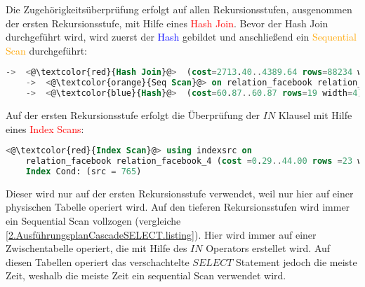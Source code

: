 Die Zugehörigkeitsüberprüfung erfolgt auf allen Rekursionsstufen, ausgenommen der ersten Rekursionsstufe, mit Hilfe eines \textcolor{red}{Hash Join}.
Bevor der Hash Join durchgeführt wird, wird zuerst der \textcolor{blue}{Hash} gebildet und anschließend ein \textcolor{orange}{Sequential Scan} durchgeführt:
\begin{lstlisting}[language=SQL,caption = Aufruf der DISTINCT Funktion,frame=single, label={2.WhereConditionCTE.listing} ]
    ->  <@\textcolor{red}{Hash Join}@>  (cost=2713.40..4389.64 rows=88234 width=4) (actual time=11.821..17.797 rows=1709 loops=1)
    ->  <@\textcolor{orange}{Seq Scan}@> on relation_facebook relation_facebook_1  (cost=10000000000.00..10000001649.62 rows=100762 width=8) (actual time=0.004..4.822 rows=100762 loops=1)
    ->  <@\textcolor{blue}{Hash}@>  (cost=60.87..60.87 rows=19 width=4) (actual time=0.022..0.022 rows=4 loops=1)
\end{lstlisting}
Auf der ersten Rekursionsstufe erfolgt die Überprüfung der $IN$ Klausel mit Hilfe eines \textcolor{red}{Index Scans}:
\begin{lstlisting}[language=SQL,caption = IndexScanFacebookRelation,frame=single, label={2.indexScanFacebookRelation.listing} ]
    <@\textcolor{red}{Index Scan}@> using indexsrc on
    relation_facebook relation_facebook_4 (cost =0.29..44.00 rows =23 width =4) ( actual time =0.009..0.012 rows =27 loops =1)
    Index Cond: (src = 765)
\end{lstlisting}
Dieser wird nur auf der ersten Rekursionsstufe verwendet, weil nur hier auf einer physischen Tabelle operiert wird.
Auf den tieferen Rekursionsstufen wird immer ein Sequential Scan vollzogen (vergleiche \ref{2.AusführungsplanCascadeSELECT.listing}).
Hier wird immer auf einer Zwischentabelle operiert, die mit Hilfe des $IN$ Operators erstellet wird.
Auf diesen Tabellen operiert das verschachtelte $SELECT$ Statement jedoch die meiste Zeit, weshalb die meiste Zeit ein sequential Scan verwendet wird.

